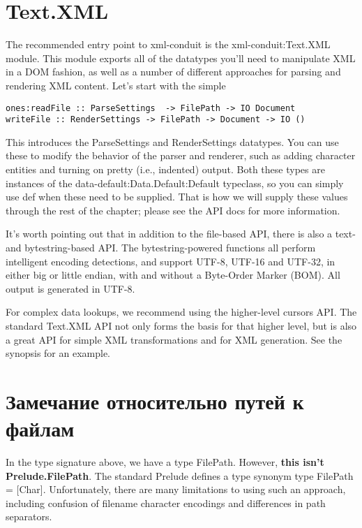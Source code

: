 
\section{Text.XML}

The recommended entry point to xml-conduit is the xml-conduit:Text.XML module. This module exports all of the datatypes you'll need to manipulate XML in a DOM fashion, as well as a number of different approaches for parsing and rendering XML content. Let's start with the simple

\begin{lstlisting}
ones:readFile :: ParseSettings  -> FilePath -> IO Document
writeFile :: RenderSettings -> FilePath -> Document -> IO ()
\end{lstlisting}

This introduces the ParseSettings and RenderSettings datatypes. You can use these to modify the behavior of the parser and renderer, such as adding character entities and turning on pretty (i.e., indented) output. Both these types are instances of the data-default:Data.Default:Default typeclass, so you can simply use def when these need to be supplied. That is how we will supply these values through the rest of the chapter; please see the API docs for more information.

It's worth pointing out that in addition to the file-based API, there is also a text- and bytestring-based API. The bytestring-powered functions all perform intelligent encoding detections, and support UTF-8, UTF-16 and UTF-32, in either big or little endian, with and without a Byte-Order Marker (BOM). All output is generated in UTF-8.

For complex data lookups, we recommend using the higher-level cursors API. The standard Text.XML API not only forms the basis for that higher level, but is also a great API for simple XML transformations and for XML generation. See the synopsis for an example.

\section{Замечание относительно путей к файлам} %

In the type signature above, we have a type FilePath. However, {\bf this isn't Prelude.FilePath}. The standard Prelude defines a type synonym type FilePath = [Char]. Unfortunately, there are many limitations to using such an approach, including confusion of filename character encodings and differences in path separators.

